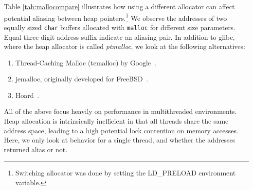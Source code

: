 \documentclass[prodmode,acmtaco]{acmsmall}
\begin{document}
Table \ref{tab:mallocompare} illustrates how using a different allocator can affect potential aliasing between heap pointers.\footnote{Switching allocator was done by setting the LD\_PRELOAD environment variable.}
We observe the addresses of two equally sized \texttt{char} buffers allocated with \texttt{malloc} for different size parameters.
Equal three digit address suffix indicate an aliasing pair.
In addition to glibc, where the heap allocator is called \emph{ptmalloc}, we look at the following alternatives:
\begin{enumerate}
  \item Thread-Caching Malloc (tcmalloc) by Google~\cite{TCMalloc}.
  \item jemalloc, originally developed for FreeBSD~\cite{JEMalloc}.
  \item Hoard~\cite{Berger:2000:Hoard}.
\end{enumerate}
All of the above focus heavily on performance in multithreaded environments.
Heap allocation is intrinsically inefficient in that all threads share the same address space, leading to a high potential lock contention on memory accesses.
Here, we only look at behavior for a single thread, and whether the addresses returned alias or not.
\begin{table}[t]
  \label{tab:mallocompare}
  \begin{tabnote}
  \end{tabnote}
\end{table}
\end{document}
